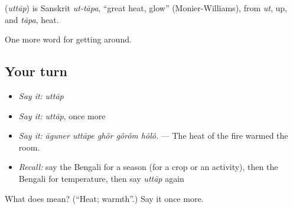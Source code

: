 \begin{cousinweb}
\textbf{} (\emph{uttāp}) is Sanskrit \emph{ut-tāpa}, \textquotedblleft{}great heat, glow\textquotedblright{} (Monier-Williams), from \emph{ut}, up, and \emph{tāpa}, heat.
\end{cousinweb}

\begin{grammarlens}[title={What you've built}]
One more word for getting around.
\end{grammarlens}

\subsection*{Your turn}
\begin{itemize}
\raggedright
  \item \emph{Say it:} \emph{uttāp}
  \item \emph{Say it:} \emph{uttāp}, once more
  \item \emph{Say it:} \emph{āguner uttāpe ghôr gôrôm hôlô.} — The heat of the fire warmed the room.
  \item \emph{Recall:} say the Bengali for a season (for a crop or an activity), then the Bengali for temperature, then say \emph{uttāp} again
\end{itemize}

\begin{tcolorbox}[breakable,colback=teal!4,colframe=teal!35!black,title={Before you move on}]
What does  mean? (\textquotedblleft{}Heat; warmth\textquotedblright{}.) Say it once more.
\end{tcolorbox}
